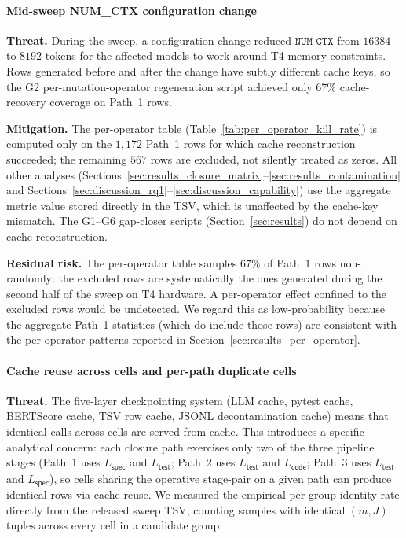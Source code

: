 \paragraph{Mid-sweep NUM_CTX configuration change}

\textbf{Threat.} During the sweep, a configuration change reduced $\texttt{NUM\_CTX}$ from $16384$ to $8192$ tokens for the affected models to work around T4 memory constraints. Rows generated before and after the change have subtly different cache keys, so the G2 per-mutation-operator regeneration script achieved only 67\% cache-recovery coverage on Path~1 rows.

\textbf{Mitigation.} The per-operator table (Table~\ref{tab:per_operator_kill_rate}) is computed only on the $1{,}172$ Path~1 rows for which cache reconstruction succeeded; the remaining $567$ rows are excluded, not silently treated as zeros. All other analyses (Sections~\ref{sec:results_closure_matrix}--\ref{sec:results_contamination} and Sections~\ref{sec:discussion_rq1}--\ref{sec:discussion_capability}) use the aggregate metric value stored directly in the TSV, which is unaffected by the cache-key mismatch. The G1--G6 gap-closer scripts (Section~\ref{sec:results}) do not depend on cache reconstruction.

\textbf{Residual risk.} The per-operator table samples $67\%$ of Path~1 rows non-randomly: the excluded rows are systematically the ones generated during the second half of the sweep on T4 hardware. A per-operator effect confined to the excluded rows would be undetected. We regard this as low-probability because the aggregate Path~1 statistics (which do include those rows) are consistent with the per-operator patterns reported in Section~\ref{sec:results_per_operator}.

\paragraph{Cache reuse across cells and per-path duplicate cells}

\textbf{Threat.} The five-layer checkpointing system (LLM cache, pytest cache, BERTScore cache, TSV row cache, JSONL decontamination cache) means that identical calls across cells are served from cache. This introduces a specific analytical concern: each closure path exercises only two of the three pipeline stages (Path~1 uses $L_{\textsf{spec}}$ and $L_{\textsf{test}}$; Path~2 uses $L_{\textsf{test}}$ and $L_{\textsf{code}}$; Path~3 uses $L_{\textsf{test}}$ and $L_{\textsf{spec}}$), so cells sharing the operative stage-pair on a given path can produce identical rows via cache reuse. We measured the empirical per-group identity rate directly from the released sweep TSV, counting samples with identical $(m, J)$ tuples across every cell in a candidate group:

